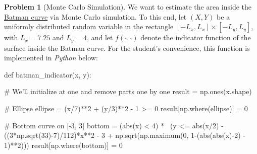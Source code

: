 \documentclass[11pt,a4paper]{article}
\theoremstyle{definition}
\newtheorem{problem}{Problem}
\theoremstyle{plain}
\begin{document}
\begin{problem}
    [Monte Carlo Simulation]

We want to estimate the area inside the \href{http://mathworld.wolfram.com/BatmanCurve.html}{Batman curve} via Monte Carlo simulation.
To this end, let $(X, Y)$ be a uniformly distributed random variable in the rectangle $[-L_x,L_x]\times[-L_y,L_y]$,
with $L_x = 7.25$ and $L_y = 4$,
and let $f(\cdot, \cdot)$ denote the indicator function of the surface inside the Batman curve.
For the student's convenience, this function is implemented in \emph{Python} below:
\begin{python}
def batman_indicator(x, y):

    # We'll initialize at one and remove parts one by one
    result = np.ones(x.shape)

    # Ellipse
    ellipse = (x/7)**2 + (y/3)**2 - 1 >= 0
    result[np.where(ellipse)] = 0

    # Bottom curve on [-3, 3]
    bottom = (abs(x) < 4) * \
             (y <= abs(x/2) - ((3*np.sqrt(33)-7)/112)*x**2 - 3
              + np.sqrt(np.maximum(0, 1-(abs(abs(x)-2) - 1)**2)))
    result[np.where(bottom)] = 0


\end{python}
\end{problem}
\end{document}
